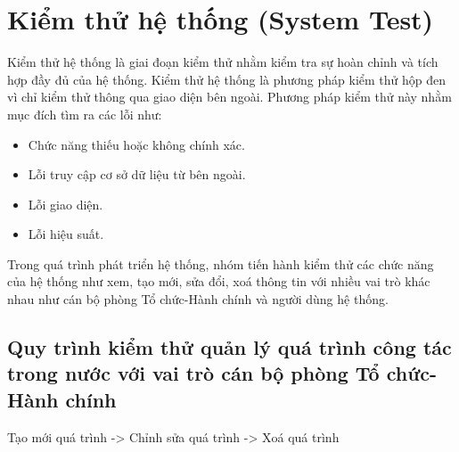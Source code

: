 \section{Kiểm thử hệ thống (System Test)}
Kiểm thử hệ thống là giai đoạn kiểm thử nhằm kiểm tra sự hoàn chỉnh và tích hợp đầy đủ của hệ thống. Kiểm thử hệ thống là phương pháp kiểm thử hộp đen vì chỉ kiểm thử thông qua giao diện bên ngoài. Phương pháp kiểm thử này nhằm mục đích tìm ra các lỗi như:
\begin{itemize}
    \item Chức năng thiếu hoặc không chính xác.
    \item Lỗi truy cập cơ sở dữ liệu từ bên ngoài.
    \item Lỗi giao diện.
    \item Lỗi hiệu suất.
\end{itemize}
Trong quá trình phát triển hệ thống, nhóm tiến hành kiểm thử các chức năng của hệ thống như xem, tạo mới, sửa đổi, xoá thông tin với nhiều vai trò khác nhau như cán bộ phòng Tổ chức-Hành chính và người dùng hệ thống.
\subsection{Quy trình kiểm thử quản lý quá trình công tác trong nước với vai trò cán bộ phòng Tổ chức-Hành chính}
Tạo mới quá trình -> Chỉnh sửa quá trình -> Xoá quá trình

